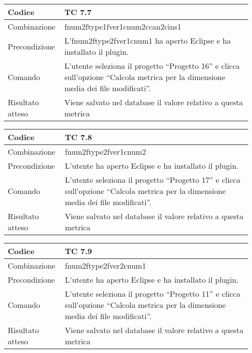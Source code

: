 \begin{table}[ht]
\begin{tabular}{|p{3cm}|p{9cm}|}
\hline
\cellcolor{lightgray}Codice				& TC 7.7								\\
\hline
\cellcolor{lightgray}Combinazione		& fnum2ftype1fver1cnum2ccan2cins1							\\
\hline
\cellcolor{lightgray}Precondizione		& L'fnum2ftype2fver1cnum1 ha aperto Eclipse e ha installato il plugin.									\\
\hline
\cellcolor{lightgray}Comando			& L'utente seleziona il progetto ``Progetto 16''  e clicca sull'opzione ``Calcola metrica per la dimensione media dei file modificati''.	\\
\hline
\cellcolor{lightgray}Risultato atteso	& Viene salvato nel database il valore relativo a questa metrica	\\
\hline
\end{tabular}
\end{table}

\begin{table}[ht]
\begin{tabular}{|p{3cm}|p{9cm}|}
\hline
\cellcolor{lightgray}Codice				& TC 7.8								\\
\hline
\cellcolor{lightgray}Combinazione		& fnum2ftype2fver1cnum2 									\\
\hline
\cellcolor{lightgray}Precondizione		& L'utente ha aperto Eclipse e ha installato il plugin.				\\
\hline
\cellcolor{lightgray}Comando			& L'utente seleziona il progetto ``Progetto 17''  e clicca sull'opzione ``Calcola metrica per la dimensione media dei file modificati''.	\\
\hline
\cellcolor{lightgray}Risultato atteso	& Viene salvato nel database il valore relativo a questa metrica	\\
\hline
\end{tabular}
\end{table}

\begin{table}[ht]
\begin{tabular}{|p{3cm}|p{9cm}|}
\hline
\cellcolor{lightgray}Codice				& TC 7.9								\\
\hline
\cellcolor{lightgray}Combinazione		& fnum2ftype2fver2cnum1 									\\
\hline
\cellcolor{lightgray}Precondizione		& L'utente ha aperto Eclipse e ha installato il plugin.								\\
\hline
\cellcolor{lightgray}Comando			& L'utente seleziona il progetto ``Progetto 11''  e clicca sull'opzione ``Calcola metrica per la dimensione media dei file modificati''.	\\
\hline
\cellcolor{lightgray}Risultato atteso	& Viene salvato nel database il valore relativo a questa metrica	\\
\hline
\end{tabular}
\end{table}

